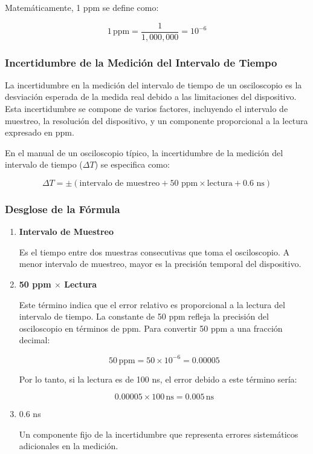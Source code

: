 Matemáticamente, 1 ppm se define como:

\[
    1 \, \text{ppm} = \frac{1}{1,000,000} = 10^{-6}
\]

\subsubsection{Incertidumbre de la Medición del Intervalo de Tiempo}

La incertidumbre en la medición del intervalo de tiempo de un osciloscopio es la desviación esperada de la medida real debido a las limitaciones del dispositivo. Esta incertidumbre se compone de varios factores, incluyendo el intervalo de muestreo, la resolución del dispositivo, y un componente proporcional a la lectura expresado en ppm.

En el manual de un osciloscopio típico, la incertidumbre de la medición del intervalo de tiempo (\(\Delta T\)) se especifica como:

\[
    \Delta T = \pm \left( \text{intervalo de muestreo} + 50 \text{ ppm} \times \text{lectura} + 0.6 \text{ ns} \right)
\]

\subsubsection{Desglose de la Fórmula}

\begin{enumerate}
    \item \textbf{Intervalo de Muestreo}

          Es el tiempo entre dos muestras consecutivas que toma el osciloscopio. A menor intervalo de muestreo, mayor es la precisión temporal del dispositivo.

    \item \textbf{50 ppm \(\times\) Lectura}

          Este término indica que el error relativo es proporcional a la lectura del intervalo de tiempo. La constante de 50 ppm refleja la precisión del osciloscopio en términos de ppm. Para convertir 50 ppm a una fracción decimal:

          \[
              50 \, \text{ppm} = 50 \times 10^{-6} = 0.00005
          \]

          Por lo tanto, si la lectura es de 100 ns, el error debido a este término sería:

          \[
              0.00005 \times 100 \, \text{ns} = 0.005 \, \text{ns}
          \]

    \item 0.6 ns

          Un componente fijo de la incertidumbre que representa errores sistemáticos adicionales en la medición.

\end{enumerate}

